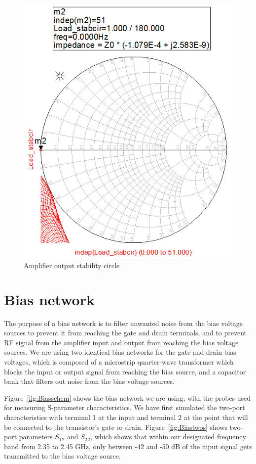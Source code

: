 \begin{figure}[H]
\begin{minipage}[b]{.45\textwidth}
	  \includegraphics[width=\linewidth]{img/Stabilization_load_circle}
  	  \caption{Amplifier output stability circle}
	  \label{fig:Stabcircle_out}
  \end{minipage}
  \end{figure}

  \section{Bias network}

  The purpose of a bias network is to filter unwanted noise from the bias voltage sources to prevent it from reaching the gate and drain terminals, and to prevent RF signal from the amplifier input and output from reaching the bias voltage sources. We are using two identical bias networks for the gate and drain bias voltages, which is composed of a microstrip quarter-wave transformer which blocks the input or output signal from reaching the bias source, and a capacitor bank that filters out noise from the bias voltage sources.

  Figure~\ref{fig:Biasschem} shows the bias network we are using, with the probes used for measuring S-parameter characteristics. We have first simulated the two-port characteristics with terminal 1 at the input and terminal 2 at the point that will be connected to the transistor's gate or drain. Figure~\ref{fig:Biastwos} shows two-port parameters $S_1$$_2$ and $S_2$$_2$, which shows that within our designated frequency band from 2.35 to 2.45 GHz, only between -42 and -50 dB of the input signal gets transmitted to the bias voltage source.

